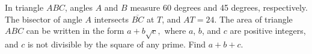 In triangle $ABC$, angles $A$ and $B$ measure 60 degrees and 45 degrees, respectively.  The bisector of angle $A$ intersects $\overline{BC}$ at $T$, and $AT=24.$  The area of triangle $ABC$ can be written in the form $a+b\sqrt{c},$ where $a$, $b$, and $c$ are positive integers, and $c$ is not divisible by the square of any prime.  Find $a+b+c.$